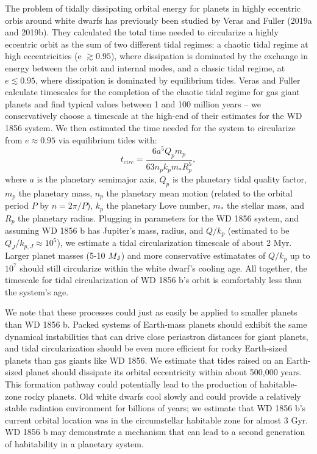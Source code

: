 \documentclass{nature3}
\newcommand{\mjup}{\ensuremath{M_{\rm J}}}
\begin{document}
\begin{methods}
The problem of tidally dissipating orbital energy for planets in highly eccentric orbis around white dwarfs has previously been studied by Veras and Fuller (2019a\cite{Veras2019a} and 2019b\cite{Veras2019b}). They calculated the total time needed to circularize a highly eccentric orbit as the sum of two different tidal regimes: a chaotic tidal regime at high eccentricities (e $\gtrsim 0.95$), where dissipation is dominated by the exchange in energy between the orbit and internal modes, and a classic tidal regime, at $e \lesssim 0.95$, where dissipation is dominated by equilibrium tides. Veras and Fuller calculate timescales for the completion of the chaotic tidal regime for gas giant planets and find typical values between 1 and 100 million years -- we conservatively choose a timescale at the high-end of their estimates for the WD 1856 system. We then estimated the time needed for the system to circularize from $e\approx0.95$  via equilibrium tides with:  
\begin{equation}
    t_{circ} = \frac{6 a^{5} Q_{p} m_{p}}{63  n_{p} k_{p} m_{*} R_{p}^{5}},
\end{equation}
where  $a$ is the planetary semimajor axis, $Q_{p}$ is the planetary tidal quality factor, $m_{p}$ the planetary mass, $n_{p}$ the planetary mean motion (related to the orbital period $P$ by $n=2\pi/P$), $k_{p}$ the planetary Love number, $m_{*}$ the stellar mass, and $R_{p}$ the planetary radius\cite{Goldreich1966}. Plugging in parameters for the WD 1856 system, and assuming WD 1856 b has Jupiter's mass, radius, and $Q/k_p$ (estimated\cite{Lainey2009} to be $Q_J/k_{p,J}\approx 10^5$), we estimate a tidal circularization timescale of about 2 Myr. Larger planet masses (5-10 \mjup) and more conservative estimatates of $Q/k_p$ up to $10^7$ should still circularize within the white dwarf's cooling age. All together, the timescale for tidal circularization of WD 1856 b's orbit is comfortably less than the system's age. 

We note that these processes could just as easily be applied to smaller planets than WD 1856 b. Packed systems of Earth-mass planets should exhibit the same dynamical instabilities that can drive close periastron distances for giant planets\cite{verasunpacking}, and tidal circularization should be even more efficient for rocky Earth-sized planets than gas giants like WD 1856. We estimate that tides raised on an Earth-sized planet should dissipate its orbital eccentricity within about 500,000 years. This formation pathway could potentially lead to the production of habitable-zone rocky planets\cite{agol2011}. Old white dwarfs cool slowly and could provide a relatively stable radiation environment for billions of years\cite{kozakis18}; we estimate that WD 1856 b's current orbital location was in the circumstellar habitable zone for almost 3 Gyr. WD 1856 b may demonstrate a mechanism that can lead to a second generation of habitability in a planetary system.  




\end{methods}
\end{document}
